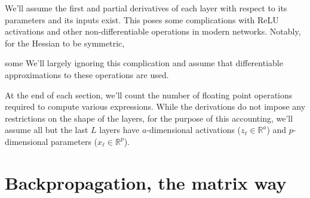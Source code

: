 \documentclass{article}
\begin{document}
We'll assume the first and partial derivatives of each layer with respect to
its parameters and its inputs exist. This poses some complications with ReLU
activations and other non-differentiable operations in modern networks.
Notably, for the Hessian to be symmetric,

some We'll largely ignoring this complication and assume that differentiable
approximations to these operations are used.

At the end of each section, we'll count the number of floating point operations
required to compute various expressions. While the derivations do not impose
any restrictions on the shape of the layers, for the purpose of this
accounting, we'll assume all but the last $L$ layers have $a$-dimensional
activations ($z_\ell \in \mathbb{R}^a$) and $p$-dimensional parameters ($x_\ell
    \in \mathbb{R}^p$).

\section{Backpropagation, the matrix way}
\end{document}
